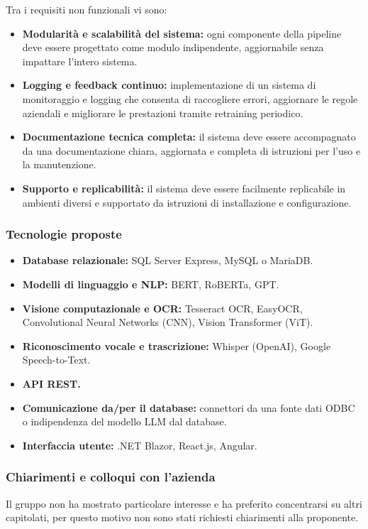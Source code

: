 \documentclass[a4paper,11pt]{article}
\begin{document}
Tra i requisiti non funzionali vi sono:
\begin{itemize}
  \item \textbf{Modularità e scalabilità del sistema:} ogni componente della pipeline deve essere progettato come modulo indipendente, aggiornabile senza impattare l'intero sistema.
  \item \textbf{Logging e feedback continuo:} implementazione di un sistema di monitoraggio e logging che consenta di raccogliere errori, aggiornare le regole aziendali e migliorare le prestazioni tramite retraining periodico.
  \item \textbf{Documentazione tecnica completa:} il sistema deve essere accompagnato da una documentazione chiara, aggiornata e completa di istruzioni per l'uso e la manutenzione.
  \item \textbf{Supporto e replicabilità:} il sistema deve essere facilmente replicabile in ambienti diversi e supportato da istruzioni di installazione e configurazione.
\end{itemize}
\subsubsection{Tecnologie proposte}
\begin{itemize}[noitemsep, topsep=0pt]
  \item \textbf{Database relazionale:} SQL Server Express, MySQL o MariaDB.
  \item \textbf{Modelli di linguaggio e NLP:} BERT, RoBERTa, GPT.
  \item \textbf{Visione computazionale e OCR:} Tesseract OCR, EasyOCR, Convolutional Neural Networks (CNN), Vision Transformer (ViT).
  \item \textbf{Riconoscimento vocale e trascrizione:} Whisper (OpenAI), Google Speech-to-Text.
  \item \textbf{API REST.}
  \item \textbf{Comunicazione da/per il database:} connettori da una fonte dati ODBC o indipendenza del modello LLM dal database.
  \item \textbf{Interfaccia utente:} .NET Blazor, React.js, Angular.
\end{itemize}

\subsubsection{Chiarimenti e colloqui con l'azienda}
Il gruppo non ha mostrato particolare interesse e ha preferito concentrarsi su altri capitolati, per questo motivo non sono stati richiesti chiarimenti alla proponente.
\end{document}
